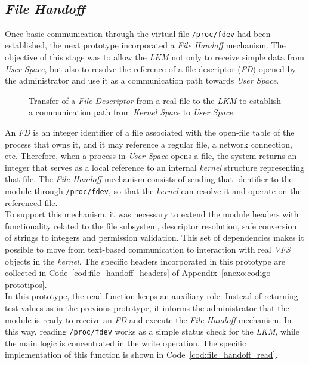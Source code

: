 \

\subsection{\textit{File Handoff}}
\label{sec:file_handoff}

Once basic communication through the virtual file \texttt{/proc/fdev} had been established, the next prototype incorporated a \textit{File Handoff} mechanism.
The objective of this stage was to allow the \textit{LKM} not only to receive simple data from \textit{User Space}, but also to resolve the reference of a file descriptor (\textit{FD}) opened by the administrator and use it as a communication path towards \textit{User Space}.\\

\begin{figure}[h!]
  \centering
  \scalebox{0.95}{}
  \caption{Transfer of a \textit{File Descriptor} from a real file to the \textit{LKM} to establish a communication path from \textit{Kernel Space} to \textit{User Space}.}
  \label{fig:file_handoff_scheme}
\end{figure}

An \textit{FD} is an integer identifier of a file associated with the open-file table of the process that owns it, and it may reference a regular file, a network connection, etc.
Therefore, when a process in \textit{User Space} opens a file, the system returns an integer that serves as a local reference to an internal \textit{kernel} structure representing that file.
The \textit{File Handoff} mechanism consists of sending that identifier to the module through \texttt{/proc/fdev}, so that the \textit{kernel} can resolve it and operate on the referenced file.\\

To support this mechanism, it was necessary to extend the module headers with functionality related to the file subsystem, descriptor resolution, safe conversion of strings to integers and permission validation.
This set of dependencies makes it possible to move from text-based communication to interaction with real \textit{VFS} objects in the \textit{kernel}.
The specific headers incorporated in this prototype are collected in Code~\ref{cod:file_handoff_headers} of Appendix~\ref{anexo:codigo-prototipos}.\\

In this prototype, the read function keeps an auxiliary role.
Instead of returning test values as in the previous prototype, it informs the administrator that the module is ready to receive an \textit{FD} and execute the \textit{File Handoff} mechanism.
In this way, reading \texttt{/proc/fdev} works as a simple status check for the \textit{LKM}, while the main logic is concentrated in the write operation.
The specific implementation of this function is shown in Code~\ref{cod:file_handoff_read}.\\

